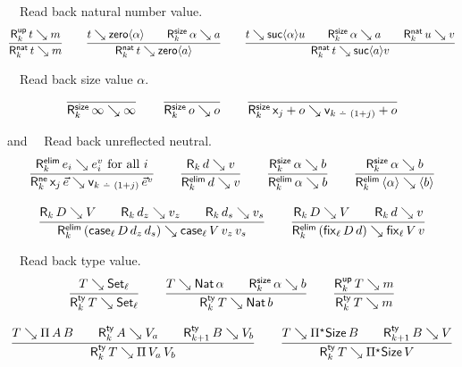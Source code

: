 \documentclass[acmsmall,screen]{acmart}\settopmatter{}
\begin{document}
\noindent
{}\ \ Read back natural number value.
\begin{gather*}
  \ru{%
      \RUp k t m
    }{\RNat k t m}
\qquad
  \ru{t \evalsto \zero{\alpha} \qquad
      \RSize k {\alpha} a
    }{\RNat k t {\zero a}}
\qquad
  \ru{t \evalsto \suc{\alpha}u \qquad
      \RSize k {\alpha} a \qquad
      \RNat k u v
    }{\RNat k t {\suc a v}}
\end{gather*}

\noindent
{}\ \ Read back size value $\alpha$.
\vspace{-1.5ex}
\begin{gather*}
  \ru{
    }{\RSize k \infty \infty}
\qquad
  \ru{
    }{\RSize k o o}
\qquad
  \ru{
    }{\RSize k {\lev j + o} {\ind{k\dotminus(1+j)} + o}}
\end{gather*}

\noindent
{} and \ \ Read back unreflected neutral.
\begin{gather*}
  \ru{%
      \RElim k {e_i} {e^v_i} \mforall i
    }{\RNe k {\lev j\,\vec e} {\ind{k \monus (1+j)}\,\vec e^v}}
\qquad
  \ru{\R k d v
    }{\RElim k d v}
\qquad
  \ru{\RSize k \alpha b
    }{\RElim k \alpha b}
\qquad
  \ru{\RSize k \alpha b
    }{\RElim k {\ann \alpha} {\ann b}}
\\[2ex]
  \ru{\R k D V \qquad
      \R k {d_z} {v_z} \qquad
      \R k {d_s} {v_s}
    }{\RElim k {(\case[\ell] D {d_z} {d_s})} {\case[\ell] V {v_z} {v_s}}}
\qquad
  \ru{\R k D V \qquad
      \R k d v
    }{\RElim k {(\fix[\ell] D d)} {\fix[\ell] V v}}
\end{gather*}

\noindent
{} \ \ Read back type value.
\begin{gather*}
  \ru{T \evalsto \Set[\ell]
    }{\RTy k T {\Set[\ell]}}
\qquad
  \ru{T \evalsto \Nat \alpha \qquad
      \RSize k \alpha b
    }{\RTy k T {\Nat b}}
\qquad
  \ru{%
      \RUp k T m
    }{\RTy k T m}
\\[2ex]
  \ru{T \evalsto \piT A B \qquad
      \RTy k A {V_a} \qquad
      \RTy {k+1} B {V_b}
    }{\RTy k T {\piT {V_a} V_b}}
\qquad
  \ru{T \evalsto \epiT \Size B \qquad
      \RTy {k+1} B {V}
    }{\RTy k T {\epiT \Size V}}
\end{gather*}
\end{document}
